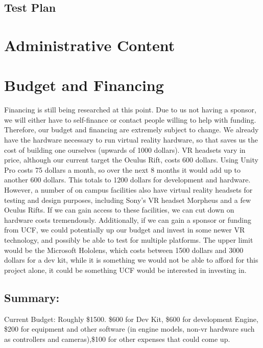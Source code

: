 \documentclass[a4paper,10pt]{article}
\begin{document}
	\subsection{Test Plan}

\pagebreak

\section{Administrative Content}
\section{Budget and Financing}
			    Financing is still being researched at this point.  Due to us not having a sponsor, we will either have to self-finance or contact people willing to help with funding.  Therefore, our budget and financing are extremely subject to change. We already have the hardware necessary to run virtual reality hardware, so that saves us the cost of building one ourselves (upwards of 1000 dollars). VR headsets vary in price, although our current target the Oculus Rift, costs 600 dollars. Using Unity Pro costs 75 dollars a month, so over the next 8 months it would add up to another 600 dollars. This totals to 1200 dollars for development and hardware. However, a number of on campus facilities also have virtual 
			    reality headsets for testing and design purposes, including Sony’s VR headset Morpheus and a few Oculus Rifts.  If we can gain access to these facilities, we can cut down on hardware costs tremendously.  Additionally, if we can gain a sponsor or funding from UCF, we could potentially up our budget and invest in some newer VR 
			    technology, and possibly be able to test for multiple platforms. The upper limit would be the Microsoft Hololens, which costs between 1500 dollars and 3000 dollars for a dev kit, while it is something we would 
			    not be able to afford for this project alone, it could be something UCF would be interested in investing in.  
			    
			    \subsection{Summary:}
			    Current Budget: Roughly \$1500.  \$600 for Dev Kit,
			    \$600 for development Engine, \$200 for equipment and other software (in engine models, non-vr hardware such as controllers and cameras),\$100 for other
			    expenses that could come up.
			    
\end{document}
